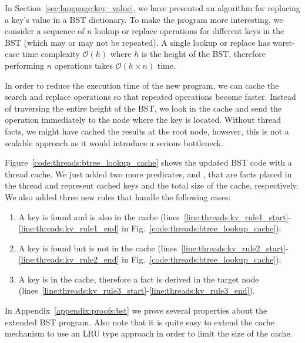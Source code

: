 In Section~\ref{sec:language:key_value}, we have presented an algorithm for
replacing a key's value in a BST dictionary. To make the program more
interesting, we consider a sequence of $n$ lookup or replace operations for
different keys in the BST (which may or may not be repeated). A single lookup or
replace has worst-case time complexity $\mathcal{O}(h)$ where $h$ is the height
of the BST, therefore performing $n$ operations takes $\mathcal{O}(h \times n)$
time.

In order to reduce the execution time of the new program, we can cache the
search and replace operations so that repeated operations become faster. Instead
of traversing the entire height of the BST, we look in the cache and send the
operation immediately to the node where the key is located. Without thread
facts, we might have cached the results at the root node, however, this is not a
scalable approach as it would introduce a serious bottleneck.

Figure~\ref{code:threads:btree_lookup_cache} shows the updated BST code with a thread
cache. We just added two more predicates,  and
, that are facts placed in the thread and represent cached
keys and the total size of the cache, respectively. We also added three new
rules that handle the following cases:

\begin{enumerate}
      \item A key is found and is also in the cache
         (lines~\ref{line:threads:kv_rule1_start}-\ref{line:threads:kv_rule1_end}
         in Fig.~\ref{code:threads:btree_lookup_cache});

      \item A key is found but is not in the cache
         (lines~\ref{line:threads:kv_rule2_start}-\ref{line:threads:kv_rule2_end}
         in Fig.~\ref{code:threads:btree_lookup_cache});

      \item A key is in the cache, therefore a  fact is
         derived in the target node
         (lines~\ref{line:threads:kv_rule3_start}-\ref{line:threads:kv_rule3_end}).

\end{enumerate}

In Appendix~\ref{appendix:proofs:bst} we prove several properties about the
extended BST program. Also note that it is quite easy to extend the cache
mechanism to use an LRU type approach in order to limit the size of the cache.

